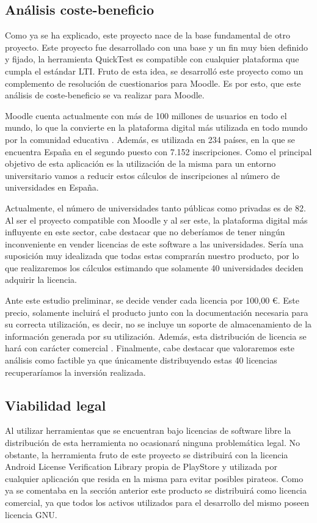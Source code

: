 \subsection{Análisis coste-beneficio}

Como ya se ha explicado, este proyecto nace de la base fundamental de otro proyecto. Este proyecto fue desarrollado con una base y un fin muy bien definido y fijado, la herramienta QuickTest es compatible con cualquier plataforma que cumpla el estándar LTI. Fruto de esta idea, se desarrolló este proyecto como un complemento de resolución de cuestionarios para Moodle. Es por esto, que este análisis de coste-beneficio se va realizar para Moodle.


Moodle cuenta actualmente con más de 100 millones de usuarios en todo el mundo, lo que la convierte en la plataforma digital más utilizada en todo mundo por la comunidad educativa \cite{wiki:mest} \cite{wiki:moodlestas}. Además, es utilizada en 234 países, en la que se encuentra España en el segundo puesto con 7.152 inscripciones.
Como el principal objetivo de esta aplicación es la utilización de la misma para un entorno universitario vamos a reducir estos cálculos de inscripciones al número de universidades en España. 


Actualmente, el número de universidades tanto públicas como privadas es de 82. 
Al ser el proyecto compatible con Moodle y al ser este, la plataforma digital más influyente en este sector, cabe destacar que no deberíamos de tener ningún inconveniente en vender licencias de este software a las universidades. Sería una suposición muy idealizada que todas estas comprarán nuestro producto, por lo que realizaremos los cálculos estimando que solamente 40 universidades deciden adquirir la licencia.


Ante este estudio preliminar, se decide vender cada licencia por 100,00 \euro. Este precio, solamente incluirá el producto junto con la documentación necesaria para su correcta utilización, es decir, no se incluye un soporte de almacenamiento de la información generada por su utilización. Además, esta distribución de licencia se hará con carácter comercial \cite{wiki:liccom}. 
Finalmente, cabe destacar que valoraremos este análisis como factible ya que únicamente distribuyendo estas 40 licencias recuperaríamos la inversión realizada.



\subsection{Viabilidad legal}

Al utilizar herramientas que se encuentran bajo licencias de software libre la distribución de esta herramienta no ocasionará ninguna problemática legal.
No obstante, la herramienta fruto de este proyecto se distribuirá con la licencia Android License Verification Library \cite{wiki:androidlic} propia de PlayStore y utilizada por cualquier aplicación que resida en la misma para evitar posibles pirateos.
Como ya se comentaba en la sección anterior este producto se distribuirá como licencia comercial, ya que todos los activos utilizados para el desarrollo del mismo poseen licencia GNU.



